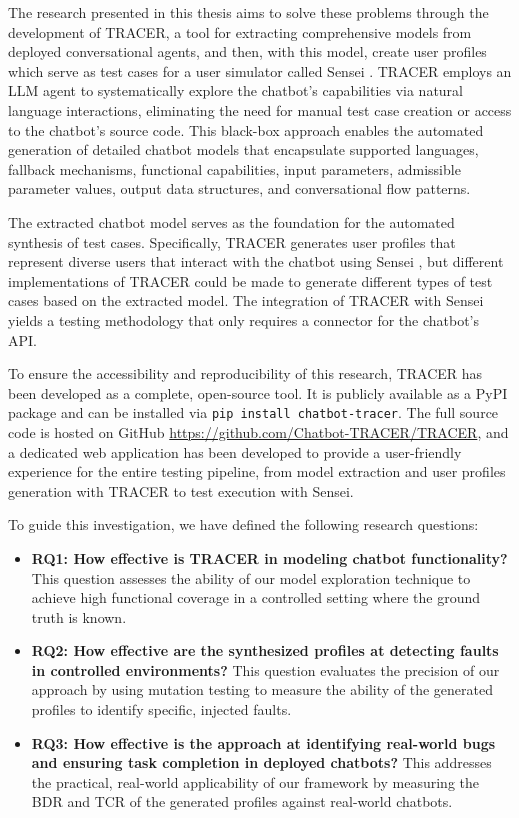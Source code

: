 The research presented in this thesis aims to solve these problems through the development of \ac{TRACER},
a tool for extracting comprehensive models from deployed conversational agents,
and then, with this model, create user profiles which serve as test cases
for a user simulator called Sensei \autocite{delaraSensei}.
\ac{TRACER} employs an \ac{LLM} agent to systematically explore the chatbot's capabilities via natural language interactions,
eliminating the need for manual test case creation or access to the chatbot's source code.
This black-box approach enables the automated generation of detailed chatbot models that encapsulate
supported languages, fallback mechanisms, functional capabilities, input parameters, admissible parameter values, output data structures, and conversational flow patterns.

The extracted chatbot model serves as the foundation for the automated synthesis of test cases.
Specifically, \ac{TRACER} generates user profiles that represent diverse users that interact with the chatbot using Sensei \autocite{delaraSensei},
but different implementations of \ac{TRACER} could be made to generate different types of test cases based on the extracted model.
The integration of \ac{TRACER} with Sensei yields a testing methodology that only requires a connector for the chatbot's API.


To ensure the accessibility and reproducibility of this research,
\ac{TRACER} has been developed as a complete, open-source tool.
It is publicly available as a \ac{PyPI} package \autocite{sotillodelhornoChatbottracerToolModel}
and can be installed via \texttt{pip install chatbot-tracer}.
The full source code is hosted on GitHub \href{https://github.com/Chatbot-TRACER/TRACER}{https://github.com/Chatbot-TRACER/TRACER},
and a dedicated web application %
has been developed to provide a user-friendly experience for the entire testing pipeline,
from model extraction and user profiles generation with \ac{TRACER} to test execution with Sensei.

To guide this investigation, we have defined the following research questions:
\begin{itemize}
\item \textbf{RQ1: How effective is TRACER in modeling chatbot functionality?}
  This question assesses the ability of our model exploration technique to achieve high functional coverage in a controlled setting where the ground truth is known.
\item \textbf{RQ2: How effective are the synthesized profiles at detecting faults in controlled environments?}
  This question evaluates the precision of our approach by using mutation testing \autocite{gomez-abajoMutationTestingTaskOriented2024}
  to measure the ability of the generated profiles to identify specific, injected faults.
\item \textbf{RQ3: How effective is the approach at identifying real-world bugs and ensuring task completion in deployed chatbots?}
  This addresses the practical, real-world applicability of our framework
  by measuring the \ac{BDR} and \ac{TCR} of the generated profiles against real-world chatbots.
\end{itemize}

